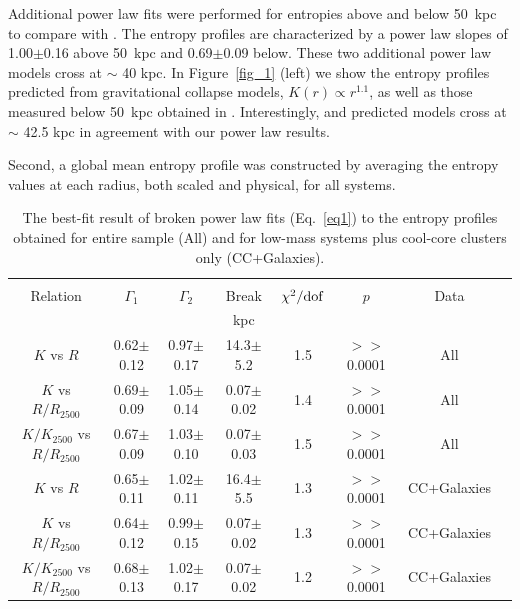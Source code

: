 \documentclass[apjl]{emulateapj}
\begin{document}
Additional power law fits were performed for entropies above and below 50~kpc to compare with \citet{Panagoulia:14}. The entropy profiles are characterized by a power law slopes of 1.00$\pm$0.16 above 50~kpc and 0.69$\pm$0.09 below. These two additional power law models cross at $\sim$ 40 kpc. In Figure~\ref{fig_1} (left) we show the entropy profiles predicted from gravitational collapse models, $K(r) \propto r^{1.1}$, as well as those measured below 50~kpc obtained in \citet{Panagoulia:14}. Interestingly, \citet{Panagoulia:14} and predicted models cross at $\sim$ 42.5 kpc in agreement with our power law results.

Second, a global mean entropy profile was constructed by averaging the entropy values at each radius, both scaled and physical, for all systems.   
\begin{table}
\centering
\caption{The best-fit result of broken power law fits (Eq.~\ref{eq1}) to the entropy profiles obtained for entire sample (All) and for low-mass systems plus cool-core clusters only (CC+Galaxies).}\label{tab_fit}
 \begin{tabular}{cccccccc}
  \hline
  &\\
  Relation & $\Gamma_1$ & $\Gamma_2$ & Break & $\chi^2/{\rm dof}$ & $p$ & Data \\
  &                  &           &  kpc     & &\\
  \hline
  $K$ vs $R$                    & 0.62$\pm$0.12 & 0.97$\pm$0.17 & 14.3$\pm$5.2  & 1.5 & $>>$0.0001 & All \\
  $K$ vs $R/R_{2500}$           & 0.69$\pm$0.09 & 1.05$\pm$0.14 & 0.07$\pm$0.02 & 1.4 & $>>$0.0001 & All \\
  $K/K_{2500}$ vs $R/R_{2500}$ & 0.67$\pm$0.09 & 1.03$\pm$0.10 & 0.07$\pm$0.03 & 1.5 & $>>$0.0001 & All \\
  $K$ vs $R$                    & 0.65$\pm$0.11 & 1.02$\pm$0.11 & 16.4$\pm$5.5 & 1.3 & $>>$0.0001 & CC+Galaxies \\
  $K$ vs $R/R_{2500}$           & 0.64$\pm$0.12 & 0.99$\pm$0.15 & 0.07$\pm$0.02 & 1.3 & $>>$0.0001 & CC+Galaxies \\
  $K/K_{2500}$ vs $R/R_{2500}$ & 0.68$\pm$0.13 & 1.02$\pm$0.17 & 0.07$\pm$0.02 & 1.2 & $>>$0.0001 & CC+Galaxies \\

\end{tabular}
\end{table}
\end{document}
